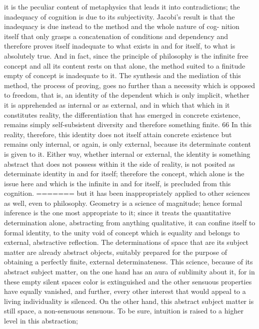 it is the peculiar content of metaphysics that leads it into contradictions;
the inadequacy of cognition is due to its subjectivity. Jacobi's result is that
the inadequacy is due instead to the method and the whole nature of cog-
nition itself that only grasps a concatenation of conditions and dependency
and therefore proves itself inadequate to what exists in and for itself, to
what is absolutely true. And in fact, since the principle of philosophy is
the infinite free concept and all its content rests on that alone, the method
suited to a finitude empty of concept is inadequate to it. The synthesis and
the mediation of this method, the process of proving, goes no further than a
necessity which is opposed to freedom, that is, an identity of the dependent
which is only implicit, whether it is apprehended as internal or as external,
and in which that which in it constitutes reality, the differentiation that
has emerged in concrete existence, remains simply self-subsistent diversity
and therefore something finite. 66 In this reality, therefore, this identity does
not itself attain concrete existence but remains only internal, or again, is only
external, because its determinate content is given to it. Either way, whether
internal or external, the identity is something abstract that does not possess
within it the side of reality, is not posited as determinate identity in and for
itself; therefore the concept, which alone is the issue here and which is the
infinite in and for itself, is precluded from this cognition.
=======
but it has been inappropriately applied
to other sciences as well, even to philosophy.
Geometry is a science of magnitude;
hence formal inference is the one most appropriate to it;
since it treats the quantitative determination alone,
abstracting from anything qualitative,
it can confine itself to formal identity,
to the unity void of concept which is equality
and belongs to external, abstractive reflection.
The determinations of space that are its
subject matter are already abstract objects,
suitably prepared for the purpose of
obtaining a perfectly finite, external determinateness.
This science, because of its abstract subject matter,
on the one hand has an aura of sublimity about it,
for in these empty silent spaces color is extinguished
and the other sensuous properties have equally vanished,
and further, every other interest that would appeal to
a living individuality is silenced.
On the other hand, this abstract subject matter is
still space, a non-sensuous sensuous.
To be sure, intuition is raised to
a higher level in this abstraction;
